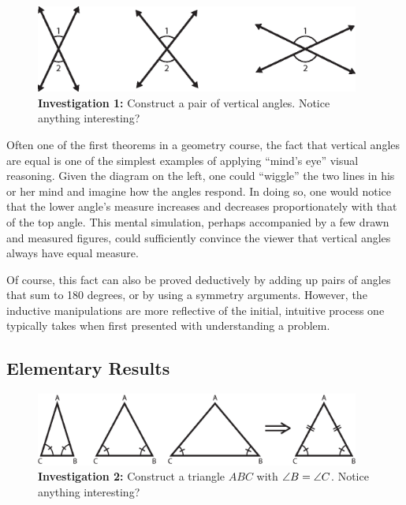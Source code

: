 \begin{figure}[h!]
\centering
\includegraphics[width=0.95\textwidth]{diagrams/vertical.eps}
\captionsetup{labelformat=empty}
\caption{{\bf Investigation 1:} Construct a pair of vertical angles.
  Notice anything interesting?}
\end{figure}

Often one of the first theorems in a geometry course, the fact that
vertical angles are equal is one of the simplest examples of applying
``mind's eye'' visual reasoning.  Given the diagram on the left, one
could ``wiggle'' the two lines in his or her mind and imagine how the
angles respond.  In doing so, one would notice that the lower angle's
measure increases and decreases proportionately with that of the top
angle.  This mental simulation, perhaps accompanied by a few drawn and
measured figures, could sufficiently convince the viewer that vertical
angles always have equal measure.

Of course, this fact can also be proved deductively by adding up pairs
of angles that sum to 180 degrees, or by using a symmetry arguments.
However, the inductive manipulations are more reflective of the
initial, intuitive process one typically takes when first presented
with understanding a problem.

\newpage
\subsection{Elementary Results}
\label{sec:elem}

\begin{figure}[h!]
\centering
\includegraphics[width=0.95\textwidth]{diagrams/isosceles-triangle.eps}
\captionsetup{labelformat=empty}
\caption{{\bf Investigation 2:} Construct a triangle $ABC$ with
$ \protect\angle B = \protect\angle C$. Notice anything interesting?}
\end{figure}

